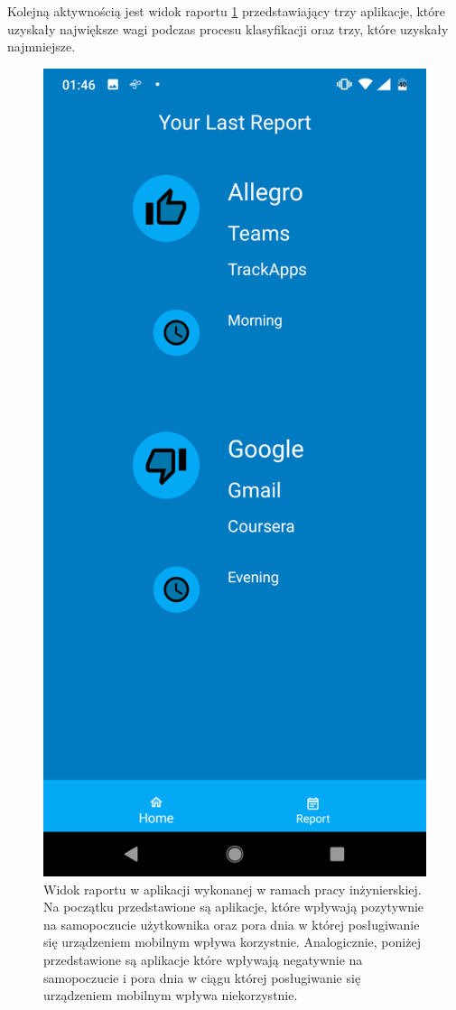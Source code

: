 \documentclass[a4paper,twoside,12pt]{book}
\begin{document}
Kolejną aktywnością jest widok raportu \ref{fig:report} przedstawiający trzy aplikacje, które uzyskały największe wagi podczas procesu klasyfikacji oraz trzy, które uzyskały najmniejsze. 
\begin{figure}[h!]
    \centering
    \includegraphics[scale=0.2]{images/report.png}
    \caption{Widok raportu w aplikacji wykonanej w ramach pracy inżynierskiej. Na początku przedstawione są aplikacje, które wpływają pozytywnie na samopoczucie użytkownika oraz pora dnia w której posługiwanie się urządzeniem mobilnym wpływa korzystnie. Analogicznie, poniżej przedstawione są aplikacje które wpływają negatywnie na samopoczucie i pora dnia w ciągu której posługiwanie się urządzeniem mobilnym wpływa niekorzystnie.}
    \label{fig:report}
\end{figure}
\end{document}
